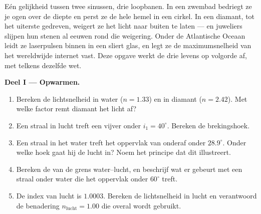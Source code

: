 \begin{problem}
\label{pb:g10:refraction:1}
Eén gelijkheid tussen twee sinussen, drie loopbanen. In een zwembad
bedriegt ze je ogen over de diepte en perst ze de hele hemel in een
cirkel. In een diamant, tot het uiterste gedreven, weigert ze het licht
naar buiten te laten --- en juweliers slijpen hun stenen al eeuwen rond
die weigering. Onder de Atlantische Oceaan leidt ze laserpulsen binnen in
een sliert glas, en legt ze de maximumsnelheid van het wereldwijde
internet vast. Deze opgave werkt de drie levens op volgorde af, met
telkens dezelfde wet.

\medskip
\noindent\textbf{Deel I --- Opwarmen.}
\begin{enumerate}
  \item Bereken de lichtsnelheid in water ($n = 1.33$) en in diamant
        ($n = 2.42$). Met welke factor remt diamant het licht af?
  \item Een straal in lucht treft een vijver onder $i_1 = 40^\circ$.
        Bereken de brekingshoek.
  \item Een straal in het water treft het oppervlak van onderaf onder
        $28.9^\circ$. Onder welke hoek gaat hij de lucht in? Noem het
        principe dat dit illustreert.
  \item Bereken de  van de grens water--lucht, en beschrijf wat
        er gebeurt met een straal onder water die het oppervlak onder
        $60^\circ$ treft.
  \item De index van lucht is $1.0003$. Bereken de lichtsnelheid in
        lucht en verantwoord de benadering $n_{\text{lucht}} = 1.00$ die
        overal wordt gebruikt.
\end{enumerate}


\end{problem}
